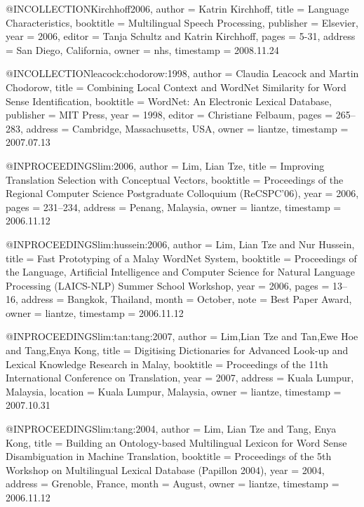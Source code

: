 @INCOLLECTION{Kirchhoff2006,
  author = {Katrin Kirchhoff},
  title = {Language Characteristics},
  booktitle = {Multilingual Speech Processing},
  publisher = {Elsevier},
  year = {2006},
  editor = {Tanja Schultz and Katrin Kirchhoff},
  pages = {5-31},
  address = {San Diego, California},
  owner = {nhs},
  timestamp = {2008.11.24}
}

@INCOLLECTION{leacock:chodorow:1998,
  author = {Claudia Leacock and Martin Chodorow},
  title = {Combining Local Context and WordNet Similarity for Word Sense Identification},
  booktitle = {WordNet: An Electronic Lexical Database},
  publisher = {MIT Press},
  year = {1998},
  editor = {Christiane Felbaum},
  pages = {265--283},
  address = {Cambridge, Massachusetts, USA},
  owner = {liantze},
  timestamp = {2007.07.13}
}

@INPROCEEDINGS{lim:2006,
  author = {Lim, Lian Tze},
  title = {Improving Translation Selection with Conceptual Vectors},
  booktitle = {Proceedings of the Regional Computer Science Postgraduate Colloquium
	(ReCSPC'06)},
  year = {2006},
  pages = {231--234},
  address = {Penang, Malaysia},
  owner = {liantze},
  timestamp = {2006.11.12}
}

@INPROCEEDINGS{lim:hussein:2006,
  author = {Lim, Lian Tze and Nur Hussein},
  title = {Fast Prototyping of a {Malay WordNet} System},
  booktitle = {Proceedings of the Language, Artificial Intelligence and Computer
	Science for Natural Language Processing (LAICS-NLP) Summer School
	Workshop},
  year = {2006},
  pages = {13--16},
  address = {Bangkok, Thailand},
  month = {October},
  note = {Best Paper Award},
  owner = {liantze},
  timestamp = {2006.11.12}
}

@INPROCEEDINGS{lim:tan:tang:2007,
  author = {Lim,Lian Tze and Tan,Ewe Hoe and Tang,Enya Kong},
  title = {Digitising Dictionaries for Advanced Look-up and Lexical Knowledge
	Research in {Malay}},
  booktitle = {Proceedings of the 11th International Conference on Translation},
  year = {2007},
  address = {Kuala Lumpur, Malaysia},
  location = {Kuala Lumpur, Malaysia},
  owner = {liantze},
  timestamp = {2007.10.31}
}

@INPROCEEDINGS{lim:tang:2004,
  author = {Lim, Lian Tze and Tang, Enya Kong},
  title = {Building an Ontology-based Multilingual Lexicon for Word Sense Disambiguation
	in Machine Translation},
  booktitle = {Proceedings of the 5th Workshop on Multilingual Lexical Database
	(Papillon 2004)},
  year = {2004},
  address = {Grenoble, France},
  month = {August},
  owner = {liantze},
  timestamp = {2006.11.12}
}

